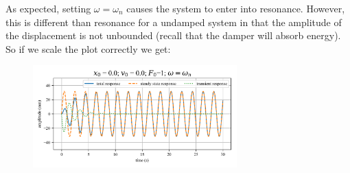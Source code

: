 \documentclass[12pt,letter]{article}
\numberwithin{ex}{section} %
\begin{document}
			As expected, setting $\omega=\omega_n$ causes the system to enter into resonance. However, this is different than resonance for a undamped system in that the amplitude of the displacement is not unbounded (recall that the damper will absorb energy). So if we scale the plot correctly we get: 
			\begin{figure}[H]
				\centering
				\includegraphics[width=0.7\textwidth]{../Figures/example_1_5.png}
			\end{figure}
			
\end{document}
